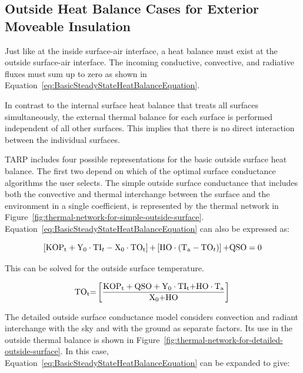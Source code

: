 \subsection{Outside Heat Balance Cases for Exterior Moveable Insulation}\label{outside-heat-balance-cases-for-exterior-moveable-insulation}

Just like at the inside surface-air interface, a heat balance must exist at the outside surface-air interface. The incoming conductive, convective, and radiative fluxes must sum up to zero as shown in Equation~\ref{eq:BasicSteadyStateHeatBalanceEquation}.

In contrast to the internal surface heat balance that treats all surfaces simultaneously, the external thermal balance for each surface is performed independent of all other surfaces. This implies that there is no direct interaction between the individual surfaces.

TARP includes four possible representations for the basic outside surface heat balance. The first two depend on which of the optimal surface conductance algorithms the user selects. The simple outside surface conductance that includes both the convective and thermal interchange between the surface and the environment in a single coefficient, is represented by the thermal network in Figure~\ref{fig:thermal-network-for-simple-outside-surface}. Equation~\ref{eq:BasicSteadyStateHeatBalanceEquation} can also be expressed as:

\begin{equation}
\left[ {{\rm{KO}}{{\rm{P}}_{\rm{t}}} + {{\rm{Y}}_{\rm{0}}}\cdot {\rm{T}}{{\rm{I}}_t} - {{\rm{X}}_{\rm{0}}}\cdot {\rm{T}}{{\rm{O}}_{\rm{t}}}} \right]{\rm{ + }}\left[ {{\rm{HO}}\cdot \left( {{{\rm{T}}_{\rm{a}}} - {\rm{T}}{{\rm{O}}_t}} \right)} \right]{\rm{  + QSO  =  0}}
\end{equation}

This can be solved for the outside surface temperature.

\begin{equation}
{\rm{T}}{{\rm{O}}_{\rm{t}}}{\rm{ = }}\left[ {\frac{{{\rm{KO}}{{\rm{P}}_{\rm{t}}} + {\rm{QSO}} + {{\rm{Y}}_0}\cdot {\rm{T}}{{\rm{I}}_{\rm{t}}}{\rm{ + HO}}\cdot {{\rm{T}}_{\rm{a}}}}}{{{{\rm{X}}_{\rm{0}}}{\rm{ + HO}}}}} \right]{\rm{  }}
\label{eq:OutsideSurfTempHeatBalEq}
\end{equation}

The detailed outside surface conductance model considers convection and radiant interchange with the sky and with the ground as separate factors. Its use in the outside thermal balance is shown in Figure~\ref{fig:thermal-network-for-detailed-outside-surface}. In this case, Equation~\ref{eq:BasicSteadyStateHeatBalanceEquation} can be expanded to give:

